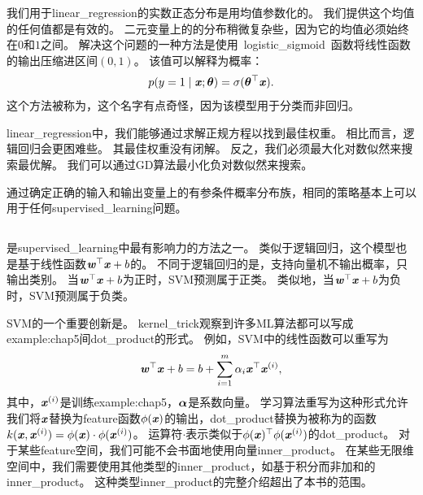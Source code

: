 我们用于\gls{linear_regression}的实数正态分布是用均值参数化的。
我们提供这个均值的任何值都是有效的。
二元变量上的的分布稍微复杂些，因为它的均值必须始终在$0$和$1$之间。
解决这个问题的一种方法是使用~\gls{logistic_sigmoid}~函数将线性函数的输出压缩进区间$(0,1)$。
该值可以解释为概率：
\begin{equation}
    p(y = 1 \mid \boldsymbol{\mathit{x}}; \boldsymbol{\theta}) = \sigma(\boldsymbol{\theta}^\top \boldsymbol{\mathit{x}}).
\end{equation}
这个方法被称为，这个名字有点奇怪，因为该模型用于分类而非回归。

\gls{linear_regression}中，我们能够通过求解正规方程以找到最佳权重。
相比而言，逻辑回归会更困难些。
其最佳权重没有闭解。
反之，我们必须最大化对数似然来搜索最优解。
我们可以通过\gls{GD}算法最小化负对数似然来搜索。

通过确定正确的输入和输出变量上的有参条件概率分布族，相同的策略基本上可以用于任何\gls{supervised_learning}问题。

\subsection{}
\label{sec:support_vector_machines}
是\gls{supervised_learning}中最有影响力的方法之一\citep{Boser92,Cortes95}。
类似于逻辑回归，这个模型也是基于线性函数$\boldsymbol{\mathit{w}}^\top \boldsymbol{\mathit{x}} + b$的。
不同于逻辑回归的是，支持向量机不输出概率，只输出类别。
当$\boldsymbol{\mathit{w}}^\top\boldsymbol{\mathit{x}} + b$为正时，\gls{SVM}预测属于正类。
类似地，当$\boldsymbol{\mathit{w}}^\top\boldsymbol{\mathit{x}} + b$为负时，\gls{SVM}预测属于负类。


\gls{SVM}的一个重要创新是。
\gls{kernel_trick}观察到许多\gls{ML}算法都可以写成\gls{example:chap5}间\gls{dot_product}的形式。
例如，\gls{SVM}中的线性函数可以重写为
\begin{equation}
    \boldsymbol{\mathit{w}}^\top \boldsymbol{\mathit{x}} + b = b + \sum_{i=1}^m \alpha_i \boldsymbol{\mathit{x}}^\top \boldsymbol{\mathit{x}}^{(i)} ,
\end{equation}
其中，$\boldsymbol{\mathit{x}}^{(i)}$是训练\gls{example:chap5}，$\boldsymbol{\alpha}$是系数向量。
学习算法重写为这种形式允许我们将$\boldsymbol{\mathit{x}}$替换为\gls{feature}函数$\phi(\boldsymbol{\mathit{x}})$的输出，\gls{dot_product}替换为被称为的函数$k(\boldsymbol{\mathit{x}}, \boldsymbol{\mathit{x}}^{(i)}) = \phi(\boldsymbol{\mathit{x}})\cdot \phi(\boldsymbol{\mathit{x}}^{(i)})$。
运算符$\cdot$表示类似于$\phi(\boldsymbol{\mathit{x}})^\top \phi(\boldsymbol{\mathit{x}}^{(i)})$的\gls{dot_product}。
对于某些\gls{feature}空间，我们可能不会书面地使用向量\gls{inner_product}。
在某些无限维空间中，我们需要使用其他类型的\gls{inner_product}，如基于积分而非加和的\gls{inner_product}。
这种类型\gls{inner_product}的完整介绍超出了本书的范围。

